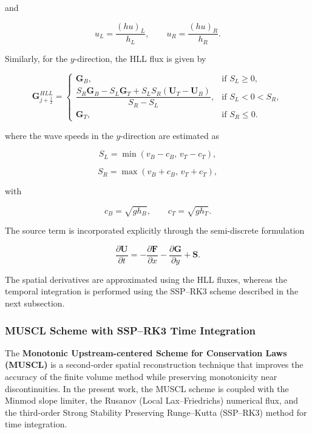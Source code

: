 \documentclass[12pt]{article}
\begin{document}
and

\begin{equation}
u_L=\frac{(hu)_L}{h_L},
\qquad
u_R=\frac{(hu)_R}{h_R}.
\end{equation}

Similarly, for the $y$-direction, the HLL flux is given by

\begin{equation}
\mathbf{G}_{j+\frac{1}{2}}^{HLL}=
\begin{cases}
\mathbf{G}_B, & \text{if } S_L \geq 0, \\[2mm]
\dfrac{S_R\mathbf{G}_B-S_L\mathbf{G}_T+S_LS_R(\mathbf{U}_T-\mathbf{U}_B)}
{S_R-S_L}, & \text{if } S_L<0<S_R, \\[3mm]
\mathbf{G}_T, & \text{if } S_R \leq 0.
\end{cases}
\end{equation}

where the wave speeds in the $y$-direction are estimated as

\begin{equation}
S_L=\min\left(v_B-c_B,\,v_T-c_T\right),
\end{equation}

\begin{equation}
S_R=\max\left(v_B+c_B,\,v_T+c_T\right),
\end{equation}

with

\begin{equation}
c_B=\sqrt{gh_B},
\qquad
c_T=\sqrt{gh_T}.
\end{equation}

The source term is incorporated explicitly through the semi-discrete formulation

\begin{equation}
\frac{\partial \mathbf{U}}{\partial t}
=
-\frac{\partial \mathbf{F}}{\partial x}
-\frac{\partial \mathbf{G}}{\partial y}
+\mathbf{S}.
\end{equation}

The spatial derivatives are approximated using the HLL fluxes, whereas the temporal integration is performed using the SSP--RK3 scheme described in the next subsection.

\subsubsection{MUSCL Scheme with SSP--RK3 Time Integration}

The \textbf{Monotonic Upstream-centered Scheme for Conservation Laws (MUSCL)} is a second-order spatial reconstruction technique that improves the accuracy of the finite volume method while preserving monotonicity near discontinuities. In the present work, the MUSCL scheme is coupled with the Minmod slope limiter, the Rusanov (Local Lax--Friedrichs) numerical flux, and the third-order Strong Stability Preserving Runge--Kutta (SSP--RK3) method for time integration.
\end{document}
